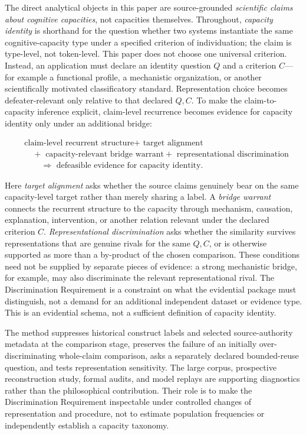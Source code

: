 \documentclass[11pt]{article}
\begin{document}
The direct analytical objects in this paper are source-grounded \emph{scientific claims about cognitive capacities}, not capacities themselves. Throughout, \emph{capacity identity} is shorthand for the question whether two systems instantiate the same cognitive-capacity type under a specified criterion of individuation; the claim is type-level, not token-level. This paper does not choose one universal criterion. Instead, an application must declare an identity question \(Q\) and a criterion \(C\)---for example a functional profile, a mechanistic organization, or another scientifically motivated classificatory standard. Representation choice becomes defeater-relevant only relative to that declared \(Q,C\). To make the claim-to-capacity inference explicit, claim-level recurrence becomes evidence for capacity identity only under an additional bridge:

\[
\begin{aligned}
&\text{claim-level recurrent structure}
+\text{ target alignment}\\
&\quad +\text{ capacity-relevant bridge warrant}
+\text{ representational discrimination}\\
&\qquad\Longrightarrow\text{ defeasible evidence for capacity identity}.
\end{aligned}
\]

Here \emph{target alignment} asks whether the source claims genuinely bear on the same capacity-level target rather than merely sharing a label. A \emph{bridge warrant} connects the recurrent structure to the capacity through mechanism, causation, explanation, intervention, or another relation relevant under the declared criterion \(C\). \emph{Representational discrimination} asks whether the similarity survives representations that are genuine rivals for the same \(Q,C\), or is otherwise supported as more than a by-product of the chosen comparison. These conditions need not be supplied by separate pieces of evidence: a strong mechanistic bridge, for example, may also discriminate the relevant representational rival. The Discrimination Requirement is a constraint on what the evidential package must distinguish, not a demand for an additional independent dataset or evidence type. This is an evidential schema, not a sufficient definition of capacity identity.

The method suppresses historical construct labels and selected source-authority metadata at the comparison stage, preserves the failure of an initially over-discriminating whole-claim comparison, asks a separately declared bounded-reuse question, and tests representation sensitivity. The large corpus, prospective reconstruction study, formal audits, and model replays are supporting diagnostics rather than the philosophical contribution. Their role is to make the Discrimination Requirement inspectable under controlled changes of representation and procedure, not to estimate population frequencies or independently establish a capacity taxonomy.
\end{document}
